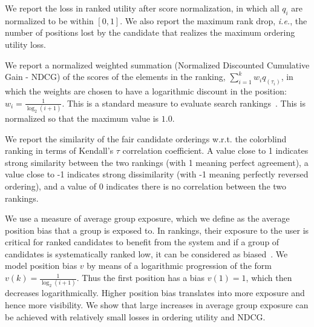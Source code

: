  We report the loss in ranked utility after score normalization, in which all $q_i$ are normalized to be within $[0, 1]$.
%
We also report the maximum rank drop, {\em i.e.}, the number of positions lost by the candidate that realizes the maximum ordering utility loss.


%
We report a normalized weighted summation (Normalized Discounted Cumulative Gain - NDCG) of the scores of the elements in the ranking, $\sum_{i=1}^{k} w_i q_{(\tau_i)}$, in which the weights are chosen to have a logarithmic discount in the position:  $w_i = \frac{1}{\log_2 (i+1)}$. This is a standard measure to evaluate search rankings~\cite{jarvelin2002cumulated}.
This is normalized so that the maximum value is $1.0$.

 We report the similarity of the fair candidate orderings w.r.t. the colorblind ranking in terms of Kendall's $\tau$ correlation coefficient.
%
A value close to 1 indicates strong similarity between the two rankings (with 1 meaning perfect agreement), a value close to -1 indicates strong dissimilarity (with -1 meaning perfectly reversed ordering), and a value of 0 indicates there is no correlation between the two rankings.

 We use a measure of average group exposure, which we define as the average position bias that a group is exposed to.
%
In rankings, their exposure to the user is critical for ranked candidates to benefit from the system and if a group of candidates is systematically ranked low, it can be considered as biased~\cite{friedman1996bias}.
%
We model position bias $v$ by means of a logarithmic progression of the form $v(k) = \frac{1}{\log_2(i+1)}$.
%
Thus the first position has a bias $v(1)=1$, which then decreases logarithmically.
%
Higher position bias translates into more exposure and hence more visibility.
%
We show that large increases in average group exposure can be achieved with relatively small losses in ordering utility and NDCG.


